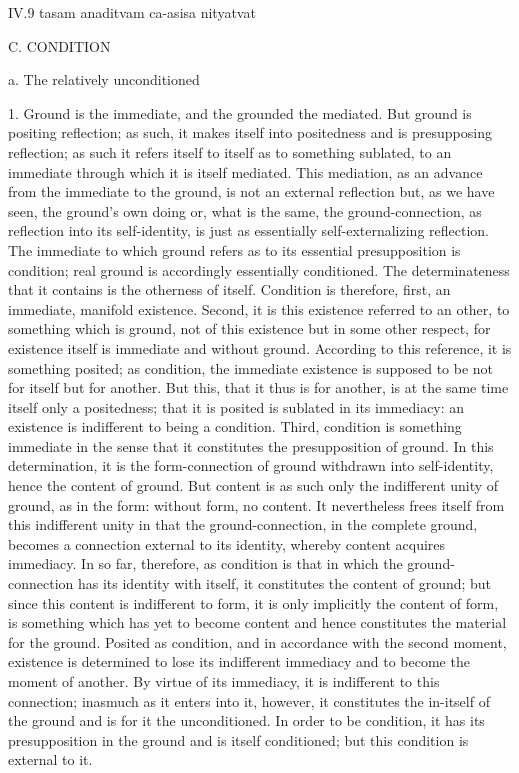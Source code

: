 IV.9
tasam anaditvam ca-asisa nityatvat

C. CONDITION

a. The relatively unconditioned

1. Ground is the immediate,
and the grounded the mediated.
But ground is positing reflection;
as such, it makes itself into positedness
and is presupposing reflection;
as such it refers itself to itself
as to something sublated,
to an immediate through which
it is itself mediated.
This mediation, as an advance
from the immediate to the ground,
is not an external reflection
but, as we have seen, the ground's own doing
or, what is the same, the ground-connection,
as reflection into its self-identity,
is just as essentially self-externalizing reflection.
The immediate to which ground refers as
to its essential presupposition is condition;
real ground is accordingly essentially conditioned.
The determinateness that it contains is
the otherness of itself.
Condition is therefore,
first, an immediate, manifold existence.
Second, it is this existence referred to an other,
to something which is ground,
not of this existence but in some other respect,
for existence itself is immediate and without ground.
According to this reference, it is something posited;
as condition, the immediate existence is supposed to be
not for itself but for another.
But this, that it thus is for another, is at the same time
itself only a positedness;
that it is posited is sublated in its immediacy:
an existence is indifferent to being a condition.
Third, condition is something immediate in the sense
that it constitutes the presupposition of ground.
In this determination, it is the form-connection of ground
withdrawn into self-identity, hence the content of ground.
But content is as such only the indifferent unity of ground,
as in the form: without form, no content.
It nevertheless frees itself
from this indifferent unity
in that the ground-connection,
in the complete ground,
becomes a connection external to its identity,
whereby content acquires immediacy.
In so far, therefore, as condition is
that in which the ground-connection has
its identity with itself,
it constitutes the content of ground;
but since this content is indifferent to form,
it is only implicitly the content of form,
is something which has yet to become content
and hence constitutes the material for the ground.
Posited as condition,
and in accordance with the second moment,
existence is determined to lose its indifferent immediacy
and to become the moment of another.
By virtue of its immediacy, it is indifferent to this connection;
inasmuch as it enters into it, however,
it constitutes the in-itself of the ground
and is for it the unconditioned.
In order to be condition,
it has its presupposition in the ground
and is itself conditioned;
but this condition is external to it.

